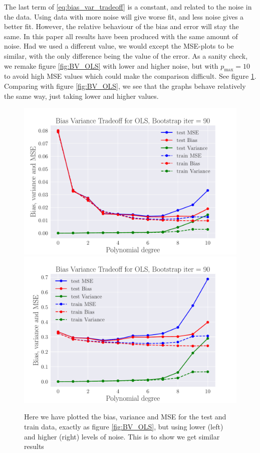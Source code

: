 \documentclass[reprint,english,notitlepage,aps,nobalancelastpage,nofootinbib]{revtex4-1}  %
\begin{document}
The last term of \eqref{eq:bias_var_tradeoff} is a constant, and related to the noise in the data. Using data with more noise will give worse fit, and less noise gives a better fit. However, the relative behaviour of the bias and error will stay the same.  In this paper all results have been produced with the same amount of noise. Had we used a different value, we would except the MSE-plots to be similar, with the only difference being the value of the error. As a sanity check, we remake figure \ref{fig:BV_OLS} with lower and higher noise, but with $p_\text{max}=10$ to avoid high MSE values which could make the comparison difficult. See figure \ref{fig:BV_OLS_noise}. Comparing with figure \ref{fig:BV_OLS}, we see that the graphs behave relatively the same way, just taking lower and higher values.

\begin{figure}[H]
	\includegraphics[width=\linewidth]{BVT_OLS_n30_eps0_1.pdf}
	\endminipage\hfill
	\includegraphics[width=\linewidth]{BVT_OLS_n30_eps0_5.pdf}
	\endminipage
	\caption{Here we have plotted the bias, variance and MSE for the test and train data, exactly as figure \ref{fig:BV_OLS}, but using lower (left) and higher (right) levels of noise. This is to show we get similar results} \label{fig:BV_OLS_noise}
\end{figure}
\end{document}
